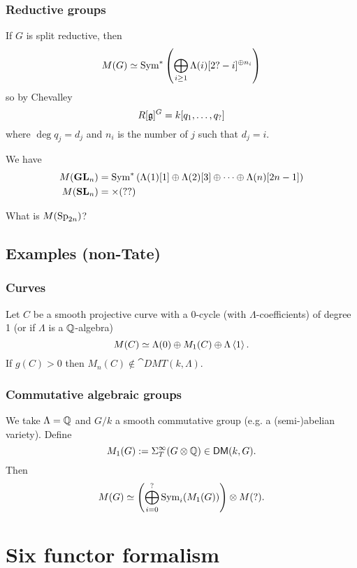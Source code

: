 \subsubsection{Reductive groups}
\begin{theorem}[Biglami]
If $G$ is split reductive, then
\[
M(G) \simeq \operatorname{Sym}^{*}\left( \bigoplus_{i\ge 1}\Lambda(i)[2?-i]^{\oplus n_i} \right)
\]
so by Chevalley
\[
R[\mathfrak{g}]^{G} = k[q_1,\dots,q_{?}]
\]
where $\deg q_j = d_j$ and $n_i$ is the number of $j$ such that $d_j=i$.
\end{theorem}
\begin{example}
We have
\begin{align*}
M(\mathbf{GL}_n) &= \operatorname{Sym}^{*}\left( \Lambda(1)[1] \oplus \Lambda(2)[3]\oplus \dots\oplus
\Lambda(n)[2n-1] \right)  \\
M(\mathbf{SL}_n) &= \times  (??)
\end{align*}
\end{example}
\begin{exercise}
What is $M(\operatorname{Sp}_{2n})$?
\end{exercise}
\subsection{Examples (non-Tate)}
\subsubsection{Curves}
\begin{proposition}
Let $C$ be a smooth projective curve with a 0-cycle (with $\Lambda$-coefficients) of
degree 1 (or if $\Lambda$ is a $\mathbb Q$-algebra)
\[
M(C) \simeq \Lambda(0) \oplus M_1(C) \oplus \Lambda \left<1 \right>.
\]
If $g(C)>0$ then $M_n(C)\not\in \cat{DMT}(k,\Lambda)$.
\end{proposition}
\subsubsection{Commutative algebraic groups}
\begin{theorem}[?]
We take $\Lambda=\mathbb Q$ and $G /k$ a smooth commutative group (e.g. a (semi-)abelian variety). Define
\[
M_1(G) := \Sigma_T^{\infty}(G\otimes \mathbb Q) \in \mathsf{DM}(k,G).
\]
Then
\[
M(G) \simeq \left( \bigoplus_{i=0}^{?}\operatorname{Sym}_i(M_1(G)) \right) \otimes M(?).
\]
\end{theorem}

\section{Six functor formalism}
